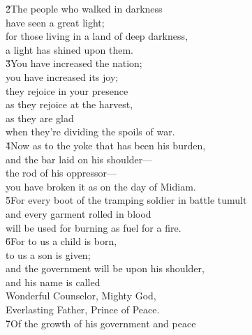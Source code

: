 \begin{poetry}
\poeml \v{2}The people who walked in darkness \\
\poemll    have seen a great light; \\
\poeml for those living in a land of deep darkness, \\
\poemll    a light has shined upon them. \\
\poeml \v{3}You have increased the nation; \\
\poemll    you have increased its joy; \\
\poeml they rejoice in your presence \\
\poemll    as they rejoice at the harvest, \\
\poeml as they are glad \\
\poemll    when they're dividing the spoils of war. \\
\poeml \v{4}Now as to the yoke that has been his burden, \\
\poemll    and the bar laid on his shoulder--- \\
\poeml the rod of his oppressor--- \\
\poemll    you have broken it as on the day of Midiam. \\
\poeml \v{5}For every boot of the tramping soldier in battle tumult \\
\poemll    and every garment rolled in blood \\
\poemlll       will be used for burning as fuel for a fire. \\
\poeml \v{6}For to us a child is born, \\
\poemll    to us a son is given; \\
\poeml and the government will be upon his shoulder, \\
\poemll    and his name is called \\
\poeml Wonderful Counselor, Mighty God, \\
\poeml Everlasting Father, Prince of Peace. \\
\poeml \v{7}Of the growth of his government and peace \\

\end{poetry}
